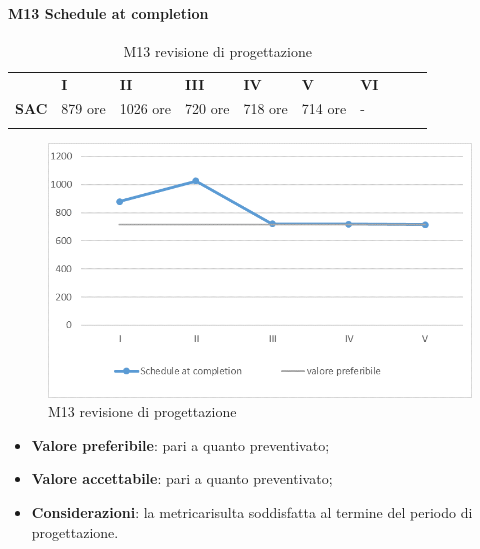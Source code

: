 \paragraph{M13 Schedule at completion} \mbox{}
\begin{longtable}[H!] {						
	>{}p{18mm}  		
	>{}p{16mm}
	>{}p{16mm}		
	>{}p{16mm}		
	>{}p{16mm}		
	>{}p{16mm}		
	>{}p{16mm}
	>{}p{16mm}
	>{}p{16mm}
	>{}p{16mm}
	}
	\rowcolor{gray!50}
	\textbf{} & \textbf{I} & \textbf{II} & \textbf{III} & \textbf{IV} & \textbf{V} & \textbf{VI} \TBstrut \\ [2mm]
	\textbf{SAC} & 879 ore & 1026 ore & 720 ore & 718 ore & 714 ore & - \TBstrut \\ [2mm]
	\rowcolor{white}
	\caption{M13 revisione di progettazione\glo}
\end{longtable}
\begin{figure}[H] 	
\includegraphics[width=\linewidth]{./img/grafici/RP10.png}	
\caption{M13 revisione di progettazione\glo}	
\end{figure}
\begin{itemize}
	\item \textbf{Valore preferibile}: pari a quanto preventivato;
	\item \textbf{Valore accettabile}: pari a quanto preventivato;
	\item \textbf{Considerazioni}: la metrica\glosp risulta soddisfatta al termine del periodo di progettazione\glo.
\end{itemize}
